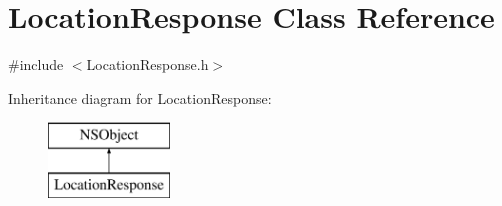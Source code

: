 \hypertarget{interface_location_response}{
\section{\-Location\-Response \-Class \-Reference}
\label{interface_location_response}
}


{\ttfamily \#include $<$\-Location\-Response.\-h$>$}

\-Inheritance diagram for \-Location\-Response\-:\begin{figure}[H]
\begin{center}
\leavevmode
\includegraphics[height=2.000000cm]{interface_location_response}
\end{center}
\end{figure}
